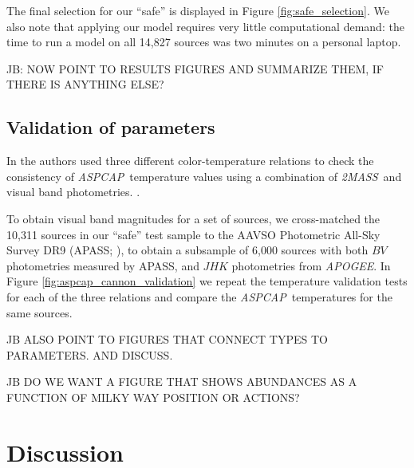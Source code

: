 \documentclass[modern]{aastex62}
\newcommand{\apogee}{\textsl{APOGEE}}
\newcommand{\aspcap}{\textsl{ASPCAP}}
\newcommand{\zmass}{\textsl{2MASS}}
\begin{document}
The final selection for our ``safe'' is displayed in Figure \ref{fig:safe_selection}. We also note that applying our model requires very little computational demand: the time to run a model on all 14,827 sources was two minutes on a personal laptop.

JB: NOW POINT TO RESULTS FIGURES AND SUMMARIZE THEM, IF THERE IS ANYTHING ELSE?

\subsection{Validation of parameters}

In \citealt{Schmidt:2016} the authors used three different color-temperature relations to check the consistency of \aspcap\ temperature values using a combination of \zmass\ and visual band photometries. \color{black}. 

To obtain visual band magnitudes for a set of sources, we cross-matched the 10,311 sources in our ``safe'' test sample to the AAVSO Photometric All-Sky Survey DR9 (APASS; \citealt{Henden:2016}), to obtain a subsample of 6,000 sources with both $BV$ photometries measured by APASS, and $JHK$ photometries from \apogee. In Figure \ref{fig:aspcap_cannon_validation} we repeat the temperature validation tests for each of the three relations and compare the \aspcap\ temperatures for the same sources. \color{gcolor}{Comments about validation results and the uncertainty of our Cannon temperatures...}\color{black}

JB ALSO POINT TO FIGURES THAT CONNECT TYPES TO PARAMETERS. AND DISCUSS.

JB DO WE WANT A FIGURE THAT SHOWS ABUNDANCES AS A FUNCTION OF MILKY WAY POSITION OR ACTIONS?

\section{Discussion} \label{sec:discussion}
\end{document}
